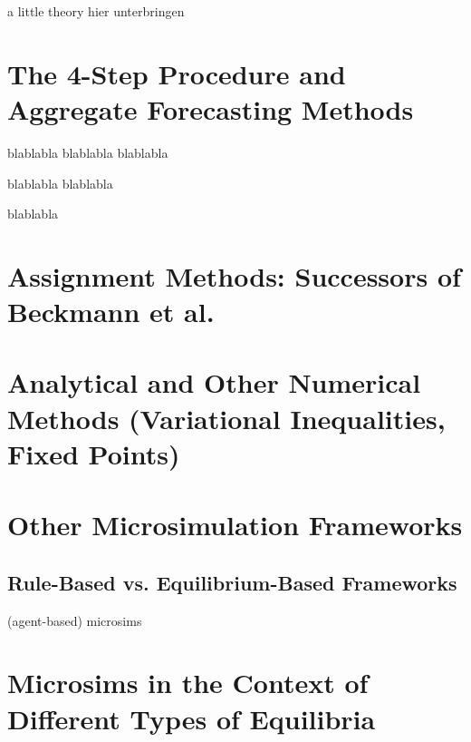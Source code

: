 a little theory hier unterbringen



\section{The 4-Step Procedure and Aggregate Forecasting Methods}
blablabla blablabla blablabla

blablabla blablabla

blablabla

\section{Assignment Methods: Successors of Beckmann et al.}

\section{Analytical and Other Numerical Methods (Variational Inequalities, Fixed Points)}

\section{Other Microsimulation Frameworks}
\subsection{Rule-Based vs. Equilibrium-Based Frameworks}

(agent-based) microsims

\section{Microsims in the Context of Different Types of Equilibria}
\label{sec:types}

